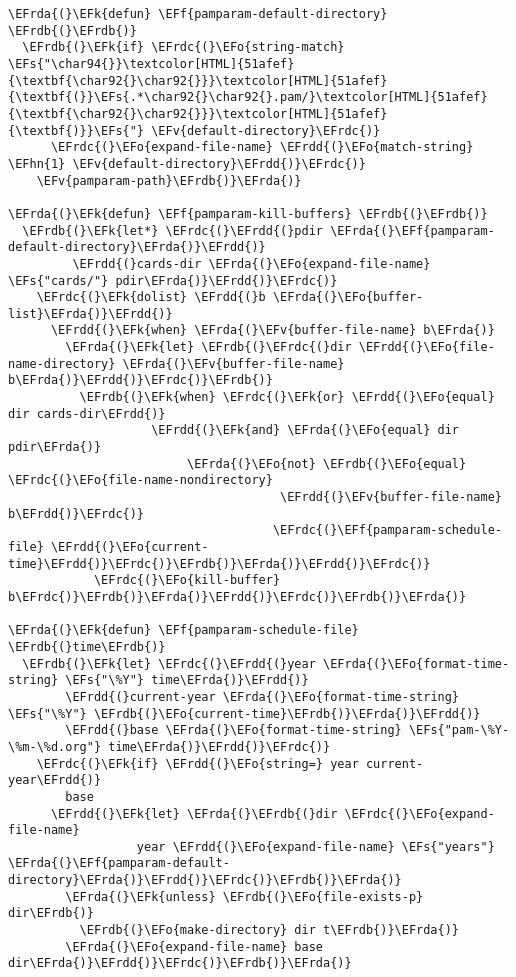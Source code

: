 \documentclass[a4wide,10pt]{article}
\newcommand{\EFs}[1]{\textcolor{EFs}{#1}} %
\newcommand{\EFk}[1]{\textcolor{EFk}{#1}} %
\newcommand{\EFf}[1]{\textcolor{EFf}{#1}} %
\newcommand{\EFv}[1]{\textcolor{EFv}{#1}} %
\newcommand{\EFo}[1]{\textcolor{EFo}{#1}} %
\newcommand{\EFhn}[1]{\textcolor{EFhn}{\textbf{#1}}} %
\newcommand{\EFrda}[1]{\textcolor{EFrda}{#1}} %
\newcommand{\EFrdb}[1]{\textcolor{EFrdb}{#1}} %
\newcommand{\EFrdc}[1]{\textcolor{EFrdc}{#1}} %
\newcommand{\EFrdd}[1]{\textcolor{EFrdd}{#1}} %
\begin{document}
\begin{Code}
\begin{Verbatim}
\EFrda{(}\EFk{defun} \EFf{pamparam-default-directory} \EFrdb{(}\EFrdb{)}
  \EFrdb{(}\EFk{if} \EFrdc{(}\EFo{string-match} \EFs{"\char94{}}\textcolor[HTML]{51afef}{\textbf{\char92{}\char92{}}}\textcolor[HTML]{51afef}{\textbf{(}}\EFs{.*\char92{}\char92{}.pam/}\textcolor[HTML]{51afef}{\textbf{\char92{}\char92{}}}\textcolor[HTML]{51afef}{\textbf{)}}\EFs{"} \EFv{default-directory}\EFrdc{)}
      \EFrdc{(}\EFo{expand-file-name} \EFrdd{(}\EFo{match-string} \EFhn{1} \EFv{default-directory}\EFrdd{)}\EFrdc{)}
    \EFv{pamparam-path}\EFrdb{)}\EFrda{)}

\EFrda{(}\EFk{defun} \EFf{pamparam-kill-buffers} \EFrdb{(}\EFrdb{)}
  \EFrdb{(}\EFk{let*} \EFrdc{(}\EFrdd{(}pdir \EFrda{(}\EFf{pamparam-default-directory}\EFrda{)}\EFrdd{)}
         \EFrdd{(}cards-dir \EFrda{(}\EFo{expand-file-name} \EFs{"cards/"} pdir\EFrda{)}\EFrdd{)}\EFrdc{)}
    \EFrdc{(}\EFk{dolist} \EFrdd{(}b \EFrda{(}\EFo{buffer-list}\EFrda{)}\EFrdd{)}
      \EFrdd{(}\EFk{when} \EFrda{(}\EFv{buffer-file-name} b\EFrda{)}
        \EFrda{(}\EFk{let} \EFrdb{(}\EFrdc{(}dir \EFrdd{(}\EFo{file-name-directory} \EFrda{(}\EFv{buffer-file-name} b\EFrda{)}\EFrdd{)}\EFrdc{)}\EFrdb{)}
          \EFrdb{(}\EFk{when} \EFrdc{(}\EFk{or} \EFrdd{(}\EFo{equal} dir cards-dir\EFrdd{)}
                    \EFrdd{(}\EFk{and} \EFrda{(}\EFo{equal} dir pdir\EFrda{)}
                         \EFrda{(}\EFo{not} \EFrdb{(}\EFo{equal} \EFrdc{(}\EFo{file-name-nondirectory}
                                      \EFrdd{(}\EFv{buffer-file-name} b\EFrdd{)}\EFrdc{)}
                                     \EFrdc{(}\EFf{pamparam-schedule-file} \EFrdd{(}\EFo{current-time}\EFrdd{)}\EFrdc{)}\EFrdb{)}\EFrda{)}\EFrdd{)}\EFrdc{)}
            \EFrdc{(}\EFo{kill-buffer} b\EFrdc{)}\EFrdb{)}\EFrda{)}\EFrdd{)}\EFrdc{)}\EFrdb{)}\EFrda{)}

\EFrda{(}\EFk{defun} \EFf{pamparam-schedule-file} \EFrdb{(}time\EFrdb{)}
  \EFrdb{(}\EFk{let} \EFrdc{(}\EFrdd{(}year \EFrda{(}\EFo{format-time-string} \EFs{"\%Y"} time\EFrda{)}\EFrdd{)}
        \EFrdd{(}current-year \EFrda{(}\EFo{format-time-string} \EFs{"\%Y"} \EFrdb{(}\EFo{current-time}\EFrdb{)}\EFrda{)}\EFrdd{)}
        \EFrdd{(}base \EFrda{(}\EFo{format-time-string} \EFs{"pam-\%Y-\%m-\%d.org"} time\EFrda{)}\EFrdd{)}\EFrdc{)}
    \EFrdc{(}\EFk{if} \EFrdd{(}\EFo{string=} year current-year\EFrdd{)}
        base
      \EFrdd{(}\EFk{let} \EFrda{(}\EFrdb{(}dir \EFrdc{(}\EFo{expand-file-name}
                  year \EFrdd{(}\EFo{expand-file-name} \EFs{"years"} \EFrda{(}\EFf{pamparam-default-directory}\EFrda{)}\EFrdd{)}\EFrdc{)}\EFrdb{)}\EFrda{)}
        \EFrda{(}\EFk{unless} \EFrdb{(}\EFo{file-exists-p} dir\EFrdb{)}
          \EFrdb{(}\EFo{make-directory} dir t\EFrdb{)}\EFrda{)}
        \EFrda{(}\EFo{expand-file-name} base dir\EFrda{)}\EFrdd{)}\EFrdc{)}\EFrdb{)}\EFrda{)}


\end{Verbatim}
\end{Code}
\end{document}
